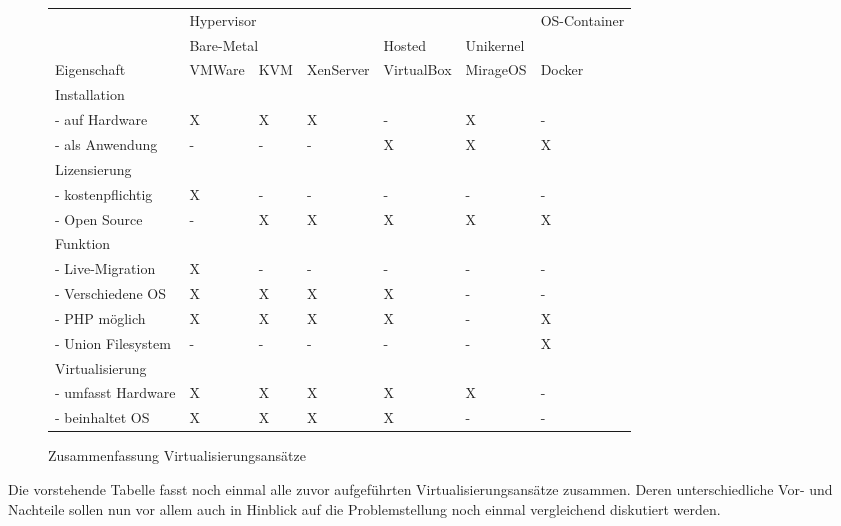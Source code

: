 \begin{figure}[!ht]
  \begin{center}
    \resizebox{14cm}{!} {
      \begin{tabular}{|l|l|l|l|l|l|l|}
      \hline
      {} & \multicolumn{5}{|l|}{Hypervisor} & OS-Container \\
      \cline{2-6}
      {} & \multicolumn{3}{|l|}{Bare-Metal} & Hosted & Unikernel & {} \\
      \hline
      Eigenschaft & VMWare & KVM & XenServer & VirtualBox & MirageOS & Docker \\
      \hline
      Installation & \multicolumn{6}{|l|}{} \\
      \hline
      - auf Hardware & X & X & X & - & X & - \\
      \hline
      - als Anwendung & - & - & - & X & X & X \\
      \hline
      Lizensierung & \multicolumn{6}{|l|}{} \\
      \hline
      - kostenpflichtig & X & - & - & - & - & - \\
      \hline
      - Open Source & - & X & X & X & X & X \\
      \hline
      Funktion & \multicolumn{6}{|l|}{} \\
      \hline
      - Live-Migration & X & - & - & - & - & - \\
      \hline
      - Verschiedene OS & X & X & X & X & - & - \\
      \hline
      - PHP möglich & X & X & X & X & - & X \\
      \hline
      - Union Filesystem & - & - & - & - & - & X \\
      \hline
      Virtualisierung & \multicolumn{6}{|l|}{} \\
      \hline
      - umfasst Hardware & X & X & X & X & X & - \\
      \hline
      - beinhaltet OS & X & X & X & X & - & - \\      
      \hline
      \end{tabular}
    }
    \caption{Zusammenfassung Virtualisierungsansätze}
  \end{center}
\end{figure}

Die vorstehende Tabelle fasst noch einmal alle zuvor aufgeführten Virtualisierungsansätze zusammen. Deren unterschiedliche Vor- und Nachteile sollen nun vor allem auch in Hinblick auf die Problemstellung noch einmal vergleichend diskutiert werden.

